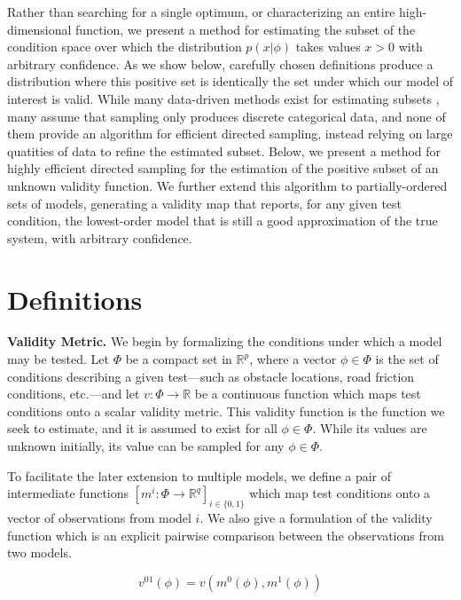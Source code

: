 \documentclass[letterpaper, 10 pt, conference]{ieeeconf}
\begin{document}
Rather than searching for a single optimum, or characterizing an entire high-dimensional function, we present a method for estimating the subset of the condition space over which the distribution $p(x|\phi)$ takes values $x>0$ with arbitrary confidence. As we show below, carefully chosen definitions produce a distribution where this positive set is identically the set under which our model of interest is valid. While many data-driven methods exist for estimating subsets \cite{ahmed03} \cite{boser92}\cite{gibbs00}, many assume that sampling only produces discrete categorical data, and none of them provide an algorithm for efficient directed sampling, instead relying on large quatities of data to refine the estimated subset. Below, we present a method for highly efficient directed sampling for the estimation of the positive subset of an unknown validity function. We further extend this algorithm to partially-ordered sets of models, generating a validity map that reports, for any given test condition, the lowest-order model that is still a good approximation of the true system, with arbitrary confidence.

\section{Definitions}
\noindent\textbf{Validity Metric.} We begin by formalizing the conditions under which a model may be tested. Let $\Phi$ be a compact set in $\mathbb{R}^p$, where a vector $\phi\in\Phi$ is the set of conditions describing a given test---such as obstacle locations, road friction conditions, etc.---and let $v:\Phi\rightarrow\mathbb{R}$ be a continuous function which maps test conditions onto a scalar validity metric. This validity function is the function we seek to estimate, and it is assumed to exist for all $\phi\in\Phi$. While its values are unknown initially, its value can be sampled for any $\phi\in\Phi$.

To facilitate the later extension to multiple models, we define a pair of intermediate functions $[m^i:\Phi\rightarrow\mathbb{R}^q]_{i\in\{0,1\}}$ which map test conditions onto a vector of observations from model $i$. We also give a formulation of the validity function which is an explicit pairwise comparison between the observations from two models.

\begin{equation}
    v^{01}(\phi) = v(m^0(\phi), m^1(\phi))
    \label{eq:valorig}
\end{equation}
\smallskip
\end{document}
